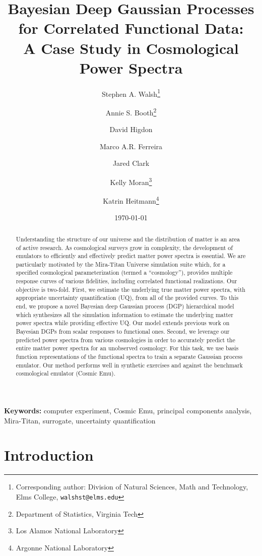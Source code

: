 \documentclass[11pt]{article}
\title{Bayesian Deep Gaussian Processes for Correlated Functional Data: \\
        A Case Study in Cosmological Power Spectra}
\author{Stephen A. Walsh\thanks{Corresponding author: Division of Natural Sciences, 
        Math and Technology, Elms College, {\tt walshst@elms.edu}} \and 
        Annie S. Booth\thanks{Department of Statistics, Virginia Tech} \and
        David Higdon\footnotemark[2] \and
        Marco A.R. Ferreira\footnotemark[2] \and
        Jared Clark\footnotemark[2] \and
        Kelly Moran\thanks{Los Alamos National Laboratory} \and
        Katrin Heitmann\thanks{Argonne National Laboratory}}
\date{\today}
\begin{document}
\maketitle
\bigskip

\begin{abstract} 
Understanding the structure of our universe and the distribution of matter is an 
area of active research.  As cosmological surveys grow in complexity, the development 
of emulators to efficiently and effectively predict matter power spectra is essential.  
We are particularly motivated by the Mira-Titan Universe simulation
suite which, for a specified cosmological parameterization (termed a ``cosmology''), 
provides multiple response curves of various fidelities, including correlated 
functional realizations.  Our objective is two-fold.  First, we estimate 
the underlying true matter power spectra, with appropriate uncertainty 
quantification (UQ), from all of the provided curves.  To this end, we propose a 
novel Bayesian deep Gaussian process (DGP) hierarchical model which synthesizes 
all the simulation information to estimate the underlying matter power spectra
while providing effective UQ.  Our model extends previous work on Bayesian DGPs 
from scalar responses to functional ones.  Second, we leverage our predicted 
power spectra from various cosmologies in order to accurately predict the entire 
matter power spectra for an 
unobserved cosmology.  For this task, we use basis function representations 
of the functional spectra to train a separate Gaussian process emulator.  
Our method performs well in synthetic exercises and against the benchmark cosmological 
emulator (Cosmic Emu).
\end{abstract}

\noindent \textbf{Keywords:} computer experiment, Cosmic Emu, 
principal components analysis, Mira-Titan, surrogate, uncertainty quantification


\section{Introduction}

\end{document}
